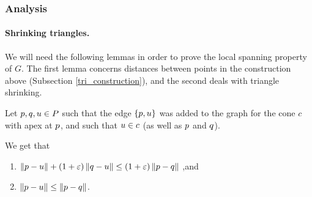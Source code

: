 \documentclass[12pt]{article}%
\begin{document}
\subsubsection{Analysis}


\paragraph{Shrinking triangles.}
We will need the following lemmas in order to prove the local spanning property of $G$. The first lemma concerns distances between points in the construction above (Subsection \ref{tri_construction}), and the second deals with triangle shrinking.


\begin{lemma}
	Let $p,q,u\in P$ such that the edge $\{p, u\}$ was added to the graph for the cone $c$ with apex at $p$, and such that $u\in c$ (as well as $p$ and $q$).
	
	We get that
	\begin{enumerate}
		\item {
			$
			\dY{\pa}{\pc}%
			+%
			(1+\eps)\dY{\pb}{\pc}%
			\leq%
			(1+\eps)\dY{\pa}{\pb}%
			$
			,and
		}
		\item {
			$
			\dY{\pa}{\pc}%
			\leq%
			\dY{\pa}{\pb}%
			$.
		}
	\end{enumerate}



\end{lemma}
\end{document}
